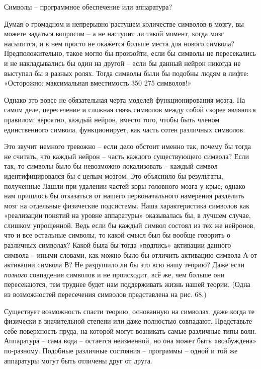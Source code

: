 \documentclass[../main.tex]{subfiles}
\begin{document}
Символы \--- программное обеспечение или аппаратура?

Думая о громадном и непрерывно растущем количестве символов в мозгу, вы можете задаться вопросом \--- а не наступит ли такой момент, когда мозг насытится, и в нем просто не окажется больше места для нового символа? Предположительно, такое могло бы произойти, если бы символы не пересекались и не накладывались бы один на другой \--- если бы данный нейрон никогда не выступал бы в разных ролях. Тогда символы были бы подобны людям в лифте: «Осторожно: максимальная вместимость 350 275 символов!»

Однако это вовсе не обязательная черта моделей функционирования мозга. На самом деле, пересечение и сложная связь символов между собой скорее являются правилом; вероятно, каждый нейрон, вместо того, чтобы быть членом единственного символа, функционирует, как часть сотен различных символов.

Это звучит немного тревожно \--- если дело обстоит именно так, почему бы тогда не считать, что каждый нейрон \--- часть каждого существующего символа? Если так, то символы было бы невозможно локализовать \--- каждый символ идентифицировался бы с целым мозгом. Это объяснило бы результаты, полученные Лашли при удалении частей коры головного мозга у крыс; однако нам пришлось бы отказаться от нашего первоначального намерения разделить мозг на отдельные физические подсистемы. Наша характеристика символов как «реализации понятий на уровне аппаратуры» оказывалась бы, в лучшем случае, слишком упрощенной. Ведь если бы каждый символ состоял из тех же нейронов, что и все остальные символы, то какой смысл был бы вообще говорить о различных символах? Какой была бы тогда «подпись» активации данного символа \--- иными словами, как можно было бы отличить активацию символа А от активации символа В? Не разрушило ли бы это всю нашу теорию? Даже если \emph{полного} совпадения символов и не происходит, всё же, чем больше они пересекаются, тем труднее будет нам поддерживать жизнь нашей теории. (Одна из возможностей пересечения символов представлена на рис. 68.)

Существует возможность спасти теорию, основанную на символах, даже когда те физически в значительной степени или даже полностью совпадают. Представьте себе поверхность пруда, на которой могут возникать самые различные типы волн. Аппаратура \--- сама вода \--- остается неизменной, но она может быть «возбуждена» по-разному. Подобные различные состояния \--- программы \--- одной и той же аппаратуры могут быть отличены друг от друга.
\end{document}
